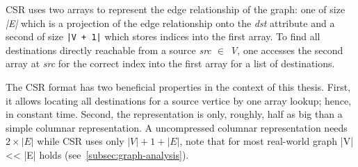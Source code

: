 CSR uses two arrays to represent the edge relationship of the graph: one of size \textit{|E|} which is a projection of the edge relationship
onto the \textit{dst} attribute and a second of size \texttt{|V + 1|} which stores indices into the first array.
To find all destinations directly reachable from a source \textit{src $\in$ V}, one accesses the second array at \textit{src} for the
correct index into the first array for a list of destinations.

The CSR format has two beneficial properties in the context of this thesis.
First, it allows locating all destinations for a source vertice by one array lookup;
hence, in constant time.
Second, the representation is only, roughly, half as big than a simple columnar representation.
A uncompressed columnar representation needs $2 \times |E|$ while CSR uses only $|V| + 1 + |E|$, note that for most real-world graph |V|
<< |E| holds (see~\cref{subsec:graph-analysis}).






